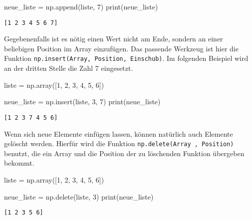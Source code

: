 \documentclass[
  letterpaper,
  DIV=11,
  numbers=noendperiod]{scrreprt}
\newenvironment{Shaded}{\begin{snugshade}}{\end{snugshade}}
\newcommand{\BuiltInTok}[1]{\textcolor[rgb]{0.00,0.23,0.31}{#1}}
\newcommand{\DecValTok}[1]{\textcolor[rgb]{0.68,0.00,0.00}{#1}}
\newcommand{\NormalTok}[1]{\textcolor[rgb]{0.00,0.23,0.31}{#1}}
\newcommand{\OperatorTok}[1]{\textcolor[rgb]{0.37,0.37,0.37}{#1}}
\begin{document}
\begin{tcolorbox}
\begin{Shaded}
\begin{Highlighting}[]
\NormalTok{neue\_liste }\OperatorTok{=}\NormalTok{ np.append(liste, }\DecValTok{7}\NormalTok{)}
\BuiltInTok{print}\NormalTok{(neue\_liste)}
\end{Highlighting}
\end{Shaded}

\begin{verbatim}
[1 2 3 4 5 6 7]
\end{verbatim}

Gegebenenfalls ist es nötig einen Wert nicht am Ende, sondern an einer
beliebigen Position im Array einzufügen. Das passende Werkzeug ist hier
die Funktion \texttt{np.insert(Array,\ Position,\ Einschub)}. Im
folgenden Beispiel wird an der dritten Stelle die Zahl 7 eingesetzt.

\begin{Shaded}
\begin{Highlighting}[]
\NormalTok{liste }\OperatorTok{=}\NormalTok{ np.array([}\DecValTok{1}\NormalTok{, }\DecValTok{2}\NormalTok{, }\DecValTok{3}\NormalTok{, }\DecValTok{4}\NormalTok{, }\DecValTok{5}\NormalTok{, }\DecValTok{6}\NormalTok{])}

\NormalTok{neue\_liste }\OperatorTok{=}\NormalTok{ np.insert(liste, }\DecValTok{3}\NormalTok{, }\DecValTok{7}\NormalTok{)}
\BuiltInTok{print}\NormalTok{(neue\_liste)}
\end{Highlighting}
\end{Shaded}

\begin{verbatim}
[1 2 3 7 4 5 6]
\end{verbatim}

Wenn sich neue Elemente einfügen lassen, können natürlich auch Elemente
gelöscht werden. Hierfür wird die Funktion
\texttt{np.delete(Array\ ,\ Position)} benutzt, die ein Array und die
Position der zu löschenden Funktion übergeben bekommt.

\begin{Shaded}
\begin{Highlighting}[]
\NormalTok{liste }\OperatorTok{=}\NormalTok{ np.array([}\DecValTok{1}\NormalTok{, }\DecValTok{2}\NormalTok{, }\DecValTok{3}\NormalTok{, }\DecValTok{4}\NormalTok{, }\DecValTok{5}\NormalTok{, }\DecValTok{6}\NormalTok{])}

\NormalTok{neue\_liste }\OperatorTok{=}\NormalTok{ np.delete(liste, }\DecValTok{3}\NormalTok{)}
\BuiltInTok{print}\NormalTok{(neue\_liste)}
\end{Highlighting}
\end{Shaded}

\begin{verbatim}
[1 2 3 5 6]
\end{verbatim}


\end{tcolorbox}
\end{document}
